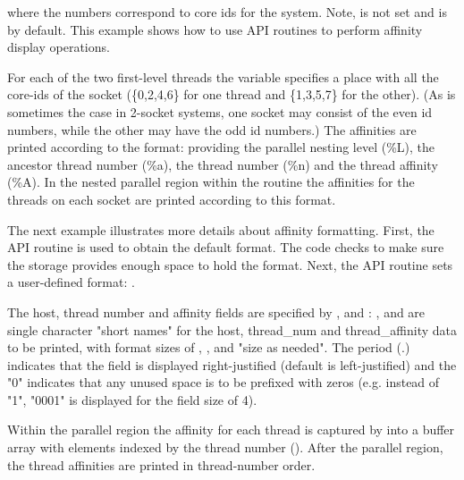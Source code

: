 where the numbers correspond to core ids for the system. Note,  is not
set and is  by default.  This example shows how to use API routines to
perform affinity display operations.

For each of the two first-level threads the  variable specifies
a place with all the core-ids of the socket (\{0,2,4,6\} for one thread and \{1,3,5,7\} for the other).
(As is sometimes the case in 2-socket systems, one socket may consist
of the even id numbers, while the other may have the odd id numbers.)  The affinities
are printed according to the  format: providing
the parallel nesting level (\%L), the ancestor thread number (\%a), the thread number (\%n)
and the thread affinity (\%A). In the nested parallel region within the  routine
the affinities for the threads on each socket are printed according to this format.



The next example illustrates more details about affinity formatting.
First, the  API routine is used to 
obtain the default format. The code checks to make sure the storage 
provides enough space to hold the format.  
Next, the  API routine sets a user-defined 
format: .   

The host, thread number and affinity fields are specified by , 
 and : ,  and  are single character "short names" 
for the host, thread\_num and thread\_affinity data to be printed,
with format sizes of , , and "size as needed". 
The period (.) indicates that the field is displayed right-justified (default is left-justified) 
and the "0" indicates that any unused space is to be prefixed with zeros 
(e.g. instead of "1", "0001" is displayed for the field size of 4).



Within the parallel region the affinity for each thread is captured by 
 into a buffer array with elements indexed 
by the thread number ().
After the parallel region, the thread affinities are printed in thread-number order.

